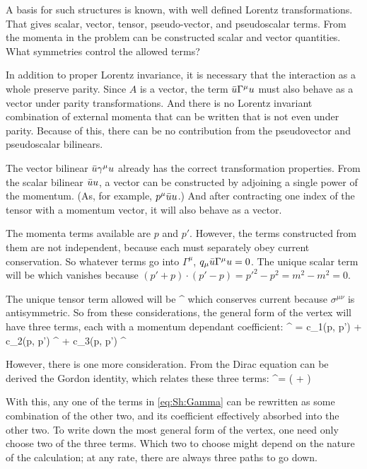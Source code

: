 A basis for such structures is known, with well defined Lorentz transformations.  That gives scalar, vector, tensor, pseudo-vector, and pseudoscalar terms.  From the momenta in the problem can be constructed scalar and vector quantities.  What symmetries control the allowed terms?

In addition to proper Lorentz invariance, it is necessary that the interaction as a whole preserve parity.  Since $A$ is a vector, the term $\bar{u} \Gamma^\mu u$ must also behave as a vector under parity transformations.  And there is no Lorentz invariant combination of external momenta that can be written that is not even under parity.   Because of this, there can be no contribution from the pseudovector and pseudoscalar bilinears.

The vector bilinear $\bar{u} \gamma^\mu u$ already has the correct transformation properties.  From the scalar bilinear $\bar{u} u$, a vector can be constructed by adjoining a single power of the momentum.  (As, for example, $p^\mu \bar{u} u$.)  And after contracting one index of the tensor with a momentum vector, it will also behave as a vector.

The momenta terms available are $p$ and $p'$.  However, the terms constructed from them are not independent, because each must separately obey current conservation.  So whatever terms go into $\Gamma^\mu$, $q_\mu \bar{u} \Gamma^\mu u = 0$.  The unique scalar term will be
\beq
	 \srb \sr
\eeq     
which vanishes because $(p'+p) \cdot (p'-p) = p'^2 - p^2 = m^2- m^2=0$.

The unique tensor term allowed will be
\beq
	 \srb \sigma^{\mu\nu} \sr
\eeq
which conserves current because $\sigma^{\mu\nu}$ is antisymmetric.  So from these considerations, the general form of the vertex will have three terms, each with a momentum dependant coefficient:
\beq \label{eq:Sh:Gamma}
	\srb \Gamma^\mu \sr 
		= 	c_1(p, p')  \srb \sr
			+ c_2(p, p') \srb \gamma^\mu \sr
			+ c_3(p, p')  \srb \sigma^{\mu\nu} \sr
\eeq

However, there is one more consideration.  From the Dirac equation can be derived the Gordon identity, which relates these three terms:
\beq \label{eq:Sh:gordon}
	\srb \gamma^\mu \sr = \srb \left(  +  \right ) \sr
\eeq

With this, any one of the terms in \eqref{eq:Sh:Gamma} can be rewritten as some combination of the other two, and its coefficient effectively absorbed into the other two.  To write down the most general form of the vertex, one need only choose two of the three terms.  Which two to choose might depend on the nature of the calculation; at any rate, there are always three paths to go down.

